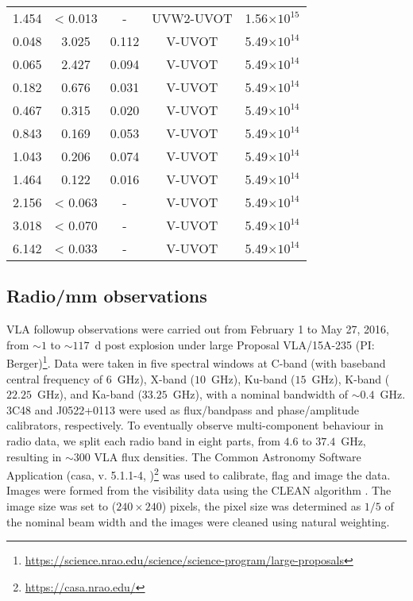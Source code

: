 \documentclass{aa}
\begin{document}
{\begin{longtable}{c|c|c|c|c}
  1.454 & < 0.013 &  -     & UVW2-UVOT &  1.56$\times 10^{15}$    \\
  0.048 &   3.025 &  0.112 & V-UVOT    &  5.49$\times 10^{14}$    \\
  0.065 &   2.427 &  0.094 & V-UVOT    &  5.49$\times 10^{14}$    \\
  0.182 &   0.676 &  0.031 & V-UVOT    &  5.49$\times 10^{14}$    \\
  0.467 &   0.315 &  0.020 & V-UVOT    &  5.49$\times 10^{14}$    \\
  0.843 &   0.169 &  0.053 & V-UVOT    &  5.49$\times 10^{14}$    \\
  1.043 &   0.206 &  0.074 & V-UVOT    &  5.49$\times 10^{14}$    \\
  1.464 &   0.122 &  0.016 & V-UVOT    &  5.49$\times 10^{14}$    \\
  2.156 & < 0.063 &  -     & V-UVOT    &  5.49$\times 10^{14}$    \\
  3.018 & < 0.070 &  -     & V-UVOT    &  5.49$\times 10^{14}$    \\
  6.142 & < 0.033 &  -     & V-UVOT    &  5.49$\times 10^{14}$    \\
\end{longtable}
}%


\subsection{Radio/mm observations}
\label{subsec:radio_vla}

VLA followup observations were carried out from February 1 to May 27, 2016, from $\sim 1$ to $\sim 117$~d post explosion \citep{Laskar16b,Laskar16c} under large Proposal VLA/15A-235 (PI: Berger)\footnote{\url{https://science.nrao.edu/science/science-program/large-proposals}}.
Data were taken in five spectral windows at C-band (with baseband central frequency of $6$~GHz), X-band ($10$~GHz), Ku-band ($15$~GHz), K-band ($22.25$~GHz), and Ka-band ($33.25$~GHz), with a nominal bandwidth of $\sim 0.4$~GHz.
3C48 and J0522+0113 were used as flux/bandpass and phase/amplitude calibrators, respectively.
To eventually observe multi-component behaviour in radio data, we split each radio band in eight parts, from $4.6$ to $37.4$~GHz, resulting in $\sim 300$ VLA flux densities.
The Common Astronomy Software Application ({\sc casa}, v. 5.1.1-4, \citealt{CASA})\footnote{\url{https://casa.nrao.edu/}} was used to calibrate, flag and image the data.
Images were formed from the visibility data using the CLEAN algorithm \citep{Hogbom74}.
The image size was set to ($240 \times 240$) pixels, the pixel size was determined as $1/5$ of the nominal beam width and the images were cleaned using natural weighting.
\end{document}
